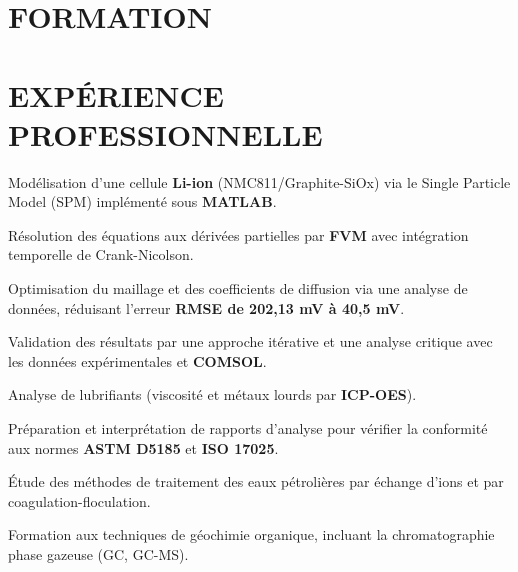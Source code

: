 \documentclass[10pt]{article}
\begin{document}

\section{FORMATION}

\section{EXPÉRIENCE PROFESSIONNELLE}
\begin{bul}
\item Modélisation d'une cellule \textbf{Li-ion} (NMC811/Graphite-SiOx) via le Single Particle Model (SPM) implémenté sous \textbf{MATLAB}.
\item Résolution des équations aux dérivées partielles par \textbf{FVM} avec intégration temporelle de Crank-Nicolson.
\item Optimisation du maillage et des coefficients de diffusion via une analyse de données, réduisant l'erreur \textbf{RMSE de 202,13 mV à 40,5 mV}.
\item Validation des résultats par une approche itérative et une analyse critique avec les données expérimentales et \textbf{COMSOL}.
\end{bul}
\begin{bul}
\item Analyse de lubrifiants (viscosité et métaux lourds par \textbf{ICP-OES}).
\item Préparation et interprétation de rapports d'analyse pour vérifier la conformité aux normes \textbf{ASTM D5185} et \textbf{ISO 17025}.
\end{bul}
\begin{bul}
\item Étude des méthodes de traitement des eaux pétrolières par échange d'ions et par coagulation-floculation.
\item Formation aux techniques de géochimie organique, incluant la chromatographie phase gazeuse (GC, GC-MS).
\end{bul}
\end{document}
